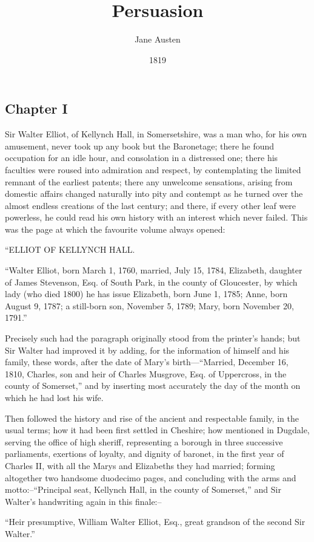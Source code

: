\documentclass[12pt, oneside]{article}   	%
\title{Persuasion}
\author{Jane Austen}
\date{1819}
\begin{document}
\maketitle
\subsection{Chapter I}
Sir Walter Elliot, of Kellynch Hall, in Somersetshire, was a man who,
for his own amusement, never took up any book but the Baronetage; there
he found occupation for an idle hour, and consolation in a distressed
one; there his faculties were roused into admiration and respect, by
contemplating the limited remnant of the earliest patents; there any
unwelcome sensations, arising from domestic affairs changed naturally
into pity and contempt as he turned over the almost endless creations
of the last century; and there, if every other leaf were powerless, he
could read his own history with an interest which never failed. This
was the page at which the favourite volume always opened:

“ELLIOT OF KELLYNCH HALL.

“Walter Elliot, born March 1, 1760, married, July 15, 1784, Elizabeth,
daughter of James Stevenson, Esq. of South Park, in the county of
Gloucester, by which lady (who died 1800) he has issue Elizabeth, born
June 1, 1785; Anne, born August 9, 1787; a still-born son, November 5,
1789; Mary, born November 20, 1791.”

Precisely such had the paragraph originally stood from the printer’s
hands; but Sir Walter had improved it by adding, for the information of
himself and his family, these words, after the date of Mary’s
birth—“Married, December 16, 1810, Charles, son and heir of Charles
Musgrove, Esq. of Uppercross, in the county of Somerset,” and by
inserting most accurately the day of the month on which he had lost his
wife.

Then followed the history and rise of the ancient and respectable
family, in the usual terms; how it had been first settled in Cheshire;
how mentioned in Dugdale, serving the office of high sheriff,
representing a borough in three successive parliaments, exertions of
loyalty, and dignity of baronet, in the first year of Charles II, with
all the Marys and Elizabeths they had married; forming altogether two
handsome duodecimo pages, and concluding with the arms and
motto:--“Principal seat, Kellynch Hall, in the county of Somerset,” and
Sir Walter’s handwriting again in this finale:--

“Heir presumptive, William Walter Elliot, Esq., great grandson of the
second Sir Walter.”
\end{document}
